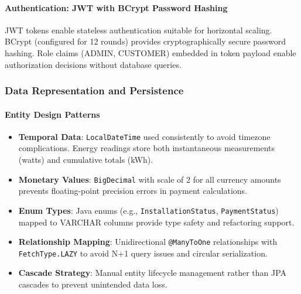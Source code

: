 \paragraph{Authentication: JWT with BCrypt Password Hashing}
JWT tokens enable stateless authentication suitable for horizontal scaling. BCrypt (configured for 12 rounds) provides cryptographically secure password hashing. Role claims (ADMIN, CUSTOMER) embedded in token payload enable authorization decisions without database queries.

\subsubsection{Data Representation and Persistence}
\label{subsubsec:data-representation}

\paragraph{Entity Design Patterns}
\begin{itemize}
    \item \textbf{Temporal Data}: \texttt{LocalDateTime} used consistently to avoid timezone complications. Energy readings store both instantaneous measurements (watts) and cumulative totals (kWh).
    \item \textbf{Monetary Values}: \texttt{BigDecimal} with scale of 2 for all currency amounts prevents floating-point precision errors in payment calculations.
    \item \textbf{Enum Types}: Java enums (e.g., \texttt{InstallationStatus}, \texttt{PaymentStatus}) mapped to VARCHAR columns provide type safety and refactoring support.
    \item \textbf{Relationship Mapping}: Unidirectional \texttt{@ManyToOne} relationships with \texttt{FetchType.LAZY} to avoid N+1 query issues and circular serialization.
    \item \textbf{Cascade Strategy}: Manual entity lifecycle management rather than JPA cascades to prevent unintended data loss.
\end{itemize}

